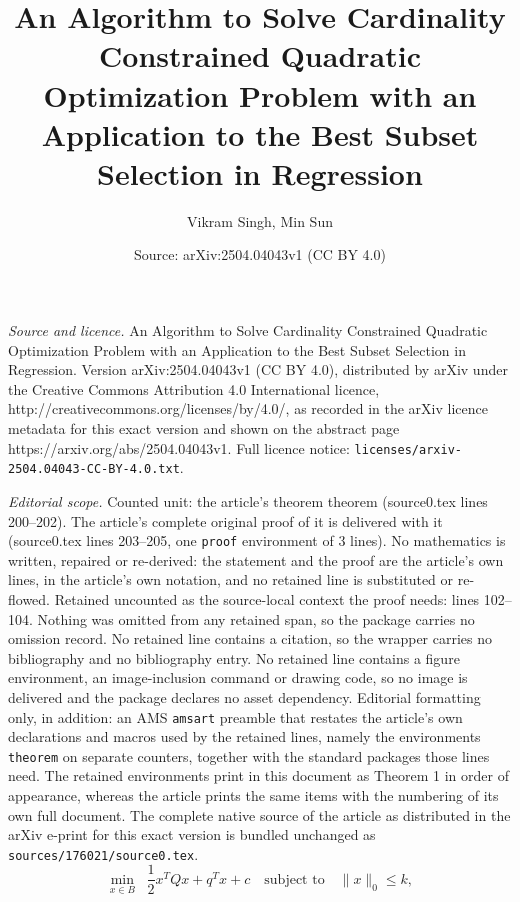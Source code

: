 \documentclass[10pt,a4paper]{amsart}
\title{An Algorithm to Solve Cardinality Constrained Quadratic Optimization Problem with an Application to the Best Subset Selection in Regression}
\author{Vikram Singh, Min Sun}
\date{Source: arXiv:2504.04043v1 (CC BY 4.0)}
\begin{document}
\maketitle

\noindent\emph{Source and licence.} An Algorithm to Solve Cardinality Constrained Quadratic Optimization Problem with an Application to the Best Subset Selection in Regression. Version arXiv:2504.04043v1 (CC BY 4.0), distributed by arXiv under the Creative Commons Attribution 4.0 International licence, http://creativecommons.org/licenses/by/4.0/, as recorded in the arXiv licence metadata for this exact version and shown on the abstract page https://arxiv.org/abs/2504.04043v1. Full licence notice: \texttt{licenses/arxiv-2504.04043-CC-BY-4.0.txt}.\par\smallskip

\noindent\textit{Editorial scope.} Counted unit: the article's theorem theorem (source0.tex lines 200--202). The article's complete original proof of it is delivered with it (source0.tex lines 203--205, one \texttt{proof} environment of 3 lines). No mathematics is written, repaired or re-derived: the statement and the proof are the article's own lines, in the article's own notation, and no retained line is substituted or re-flowed.  Retained uncounted as the source-local context the proof needs: lines 102--104.  Nothing was omitted from any retained span, so the package carries no omission record.  No retained line contains a citation, so the wrapper carries no bibliography and no bibliography entry.  No retained line contains a figure environment, an image-inclusion command or drawing code, so no image is delivered and the package declares no asset dependency.  Editorial formatting only, in addition: an AMS \texttt{amsart} preamble that restates the article's own declarations and macros used by the retained lines, namely the environments \texttt{theorem} on separate counters, together with the standard packages those lines need.  The retained environments print in this document as Theorem 1 in order of appearance, whereas the article prints the same items with the numbering of its own full document.  The complete native source of the article as distributed in the arXiv e-print for this exact version is bundled unchanged as \texttt{sources/176021/source0.tex}.
\begin{equation}\label{ccqo}
    \min_{x \in B } \;\; \frac{1}{2}x^{T}Q x + q^{T}x +c \quad \text{subject to} \quad \|x\|_{0} \leq k, \tag{CCQO}
\end{equation}
\end{document}

